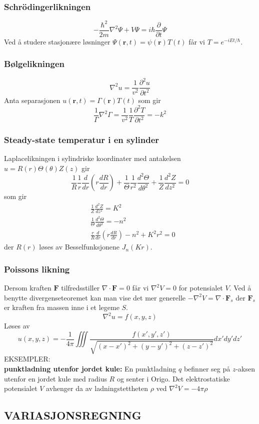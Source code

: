 \documentclass[a4paper, norsk, 8pt]{article}
\newcommand{\EQU}[1] { \begin{equation*} \begin{split}
#1  
\end{split} \end{equation*} }
\newcommand{\PAR}[2]{ \frac{\partial #1}{\partial #2}}
\newcommand{\DIFF}[2]{ \frac{d#1}{d#2} }
\begin{document}
\begin{multicols*}{2}
\subsubsection*{\small Schrödingerlikningen}
\[
-\frac{\hbar^2}{2m}\nabla^2 \Psi + V\Psi = i\hbar \PAR{}{t}\Psi
\]
Ved å studere stasjonære løsninger $\Psi(\mathbf{r},t)=\psi(\mathbf{r})T(t)$ får vi $T=e^{-i E t /\hbar}$.
\subsubsection*{\small Bølgelikningen}
\[
\nabla^2 u = \frac{1}{v^2}\PAR{^2u}{t^2}
\]
Anta separasjonen $u(\mathbf{r},t)=\Gamma(\mathbf{r})T(t)$ som gir
\[
\frac{1}{\Gamma}\nabla^2\Gamma = \frac{1}{v^2}\frac{1}{T}\PAR{^2T}{t^2}=-k^2
\]
\subsubsection*{\small Steady-state temperatur i en sylinder}
Laplacelikningen i sylindriske koordinater med antakelsen $u=R(r)\Theta(\theta)Z(z)$ gir
\[
\frac{1}{R}\frac{1}{r}\DIFF{}{r}\left(r\DIFF{R}{r}\right)+\frac{1}{\Theta}\frac{1}{r^2}\DIFF{^2\Theta}{\theta^2}+\frac{1}{Z}\DIFF{^2 Z}{z^2}=0
\]
som gir 
\EQU{
& \frac{1}{Z}\DIFF{^2Z}{z^2}=K^2 \\
& \frac{1}{\Theta} \DIFF{^2 \Theta}{\theta^2}=-n^2 \\
& \frac{r}{R}\DIFF{}{r}\left(r\DIFF{R}{r}\right)-n^2+K^2 r^2=0
}
der $R(r)$ løses av Besselfunksjonene $J_n(Kr)$.


\subsubsection*{\small Poissons likning}
Dersom kraften $\mathbf{F}$ tilfredsstiller $\nabla \cdot \mathbf{F}=0$ får vi $\nabla^2V=0$ for potensialet $V$. Ved å benytte divergenseteoremet kan man vise det mer generelle $-\nabla^2V=\nabla \cdot \mathbf{F}_s$ der $\mathbf{F}_s$ er kraften fra massen inne i et legeme $S$.
\[
\nabla^2 u = f(x,y,z)
\]
Løses av
\[
u(x,y,z)=-\frac{1}{4\pi}\iiint \frac{f(x',y',z')}{\sqrt{(x-x')^2+(y-y')^2+(z-z')^2}}dx'dy'dz'
\]
EKSEMPLER: \\
\textbf{punktladning utenfor jordet kule:} En punktladning $q$ befinner seg på $z$-aksen utenfor en jordet kule med radius $R$ og senter i Origo. Det elektrostatiske potensialet $V$ avhenger da av ladningstettheten $\rho$ ved $\nabla^2 V = -4\pi \rho$


\subsection*{\footnotesize VARIASJONSREGNING }

\end{multicols*}
\end{document}
